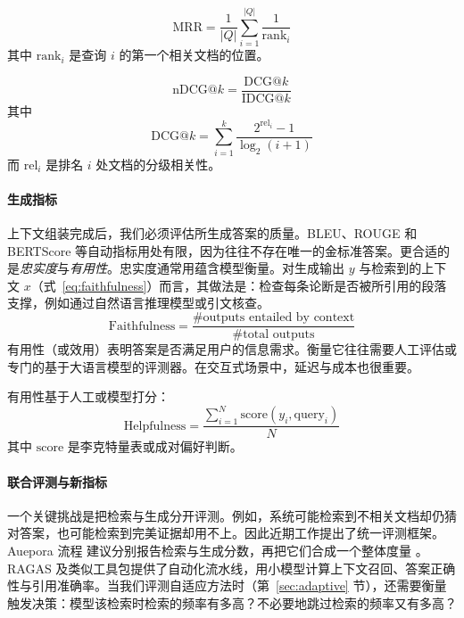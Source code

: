 \begin{equation}
\mathrm{MRR} = \frac{1}{|Q|} \sum_{i=1}^{|Q|} \frac{1}{\mathrm{rank}_i}
\label{eq:MRR}
\end{equation}
其中 $\mathrm{rank}_i$ 是查询 $i$ 的第一个相关文档的位置。

\begin{equation}
\mathrm{nDCG@}k = \frac{\mathrm{DCG@}k}{\mathrm{IDCG@}k}
\label{eq:nDCG}
\end{equation}
其中
\[
\mathrm{DCG@}k = \sum_{i=1}^k \frac{2^{\mathrm{rel}_i} - 1}{\log_2(i+1)}
\]
而 $\mathrm{rel}_i$ 是排名 $i$ 处文档的分级相关性。


\paragraph{生成指标}  上下文组装完成后，我们必须评估所生成答案的质量。BLEU、ROUGE 和 BERTScore 等自动指标用处有限，因为往往不存在唯一的金标准答案。更合适的是\emph{忠实度}与\emph{有用性}。忠实度通常用蕴含模型衡量。对生成输出 $y$ 与检索到的上下文 $x$（式~\ref{eq:faithfulness}）而言，其做法是：检查每条论断是否被所引用的段落支撑，例如通过自然语言推理模型或引文核查。  
\begin{equation}
    \mathrm{Faithfulness} = \frac{\text{\# outputs entailed by context}}{\text{\# total outputs}}
    \label{eq:faithfulness}
\end{equation}
有用性（或效用）表明答案是否满足用户的信息需求。衡量它往往需要人工评估或专门的基于大语言模型的评测器。在交互式场景中，延迟与成本也很重要。

有用性基于人工或模型打分：
\begin{equation}
\mathrm{Helpfulness} = \frac{\sum_{i=1}^N \text{score}(y_i, \text{query}_i)}{N}
\label{eq:helpfullness}
\end{equation}
其中 $\text{score}$ 是李克特量表或成对偏好判断。


\paragraph{联合评测与新指标}  一个关键挑战是把检索与生成分开评测。例如，系统可能检索到不相关文档却仍猜对答案，也可能检索到完美证据却用不上。因此近期工作提出了统一评测框架。Auepora 流程 %
建议分别报告检索与生成分数，再把它们合成一个整体度量 \citep{yu2024rag_eval}。RAGAS 及类似工具包提供了自动化流水线，用小模型计算上下文召回、答案正确性与引用准确率。当我们评测自适应方法时（第~\ref{sec:adaptive} 节），还需要衡量触发决策：模型该检索时检索的频率有多高？不必要地跳过检索的频率又有多高？

